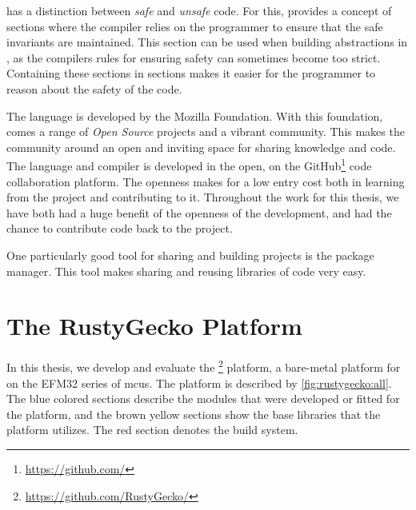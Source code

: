 {\rust} has a distinction between \emph{safe} and \emph{unsafe} code.
For this, {\rust} provides a concept of {\unsafe} sections where the compiler relies on the programmer to ensure that the safe invariants are maintained.
This section can be used when building abstractions in {\rust}, as the compilers rules for ensuring safety can sometimes become too strict.
Containing these sections in {\unsafe} sections makes it easier for the programmer to reason about the safety of the code.

The {\rust} language is developed by the Mozilla Foundation.
With this foundation, comes a range of \emph{Open Source} projects and a vibrant community.
This makes the community around {\rust} an open and inviting space for sharing knowledge and code.
The {\rust} language and compiler is developed in the open, on the GitHub\footnote{\url{https://github.com/}} code collaboration platform.
The openness makes for a low entry cost both in learning from the project and contributing to it.
Throughout the work for this thesis, we have both had a huge benefit of the openness of the development, and had the chance to contribute code back to the {\rust} project.

One particularly good tool for sharing and building {\rust} projects is the {\cargo} package manager.
This tool makes sharing and reusing libraries of code very easy.

\section{The RustyGecko Platform}

In this thesis, we develop and evaluate the {\rg}\footnote{\url{https://github.com/RustyGecko/}} platform, a bare-metal platform for {\rust} on the EFM32 series of \glspl{mcu}.
The platform is described by \autoref{fig:rustygecko:all}.
The blue colored sections describe the {\rust} modules that were developed or fitted for the platform, and the brown yellow sections show the base {\C} libraries that the platform utilizes.
The red section denotes the build system.

